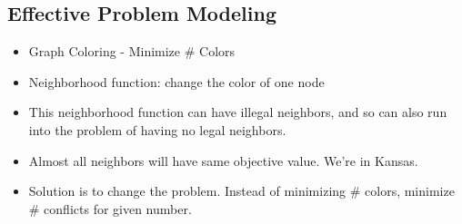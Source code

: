\documentclass[12pt, letter]{article}
\begin{document}
\subsection*{Effective Problem Modeling}
\begin{itemize}
	\item Graph Coloring - Minimize \# Colors
	\item Neighborhood function: change the color of one node
	\item This neighborhood function can have illegal neighbors, and so can also run into the problem of having no legal neighbors.
	\item Almost all neighbors will have same objective value. We're in Kansas.
	\item Solution is to change the problem. Instead of minimizing \# colors, minimize \# conflicts for given number.
\end{itemize}
\end{document}
